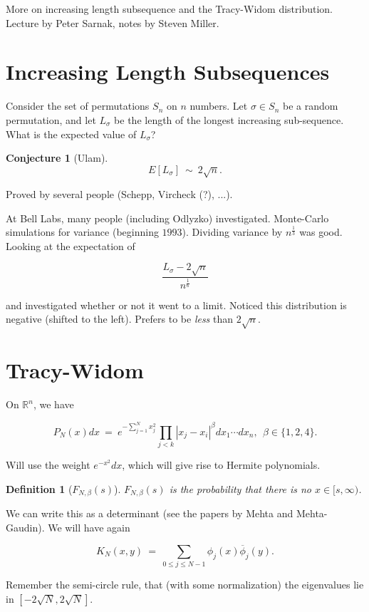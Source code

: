 \documentclass[12pt,letterpaper]{report}
\newcommand\be{\begin{equation}}
\newcommand\ee{\end{equation}}
\newcommand{\R}{\ensuremath{\mathbb{R}}}
\newtheorem{conj}[thm]{Conjecture}
\newtheorem{defi}[thm]{Definition}
\begin{document}
More on increasing length subsequence and the Tracy-Widom
distribution. Lecture by Peter Sarnak, notes by Steven Miller.


\section{Increasing Length Subsequences}

Consider the set of permutations $S_n$ on $n$ numbers. Let $\sigma
\in S_n$ be a random permutation, and let $L_\sigma$ be the length
of the longest increasing sub-sequence. What is the expected value
of $L_\sigma$?

\begin{conj}[Ulam]
\be E[L_\sigma] \ \sim \ 2 \sqrt{n}. \ee
\end{conj}

Proved by several people (Schepp, Vircheck (?), ...).

At Bell Labs, many people (including Odlyzko) investigated.
Monte-Carlo simulations for variance (beginning $1993$). Dividing
variance by $n^{\frac{1}{3}}$ was good. Looking at the expectation
of

\be \frac{L_\sigma - 2 \sqrt{n}}{n^{\frac{1}{6}}} \ee

and investigated whether or not it went to a limit. Noticed this
distribution is negative (shifted to the left). Prefers to be
\emph{less} than $2\sqrt{n}$.

\section{Tracy-Widom}

On $\R^n$, we have

\be P_N(x) dx \ = \ e^{-\sum_{j=1}^N x_j^2} \prod_{j<k} \left| x_j
- x_i \right|^\beta dx_1 \cdots dx_n, \ \ \beta \in \{1,2,4\}. \ee


Will use the weight $e^{-x^2} dx$, which will give rise to Hermite
polynomials.

\begin{defi}[$F_{N,\beta}(s)$] $F_{N,\beta}(s)$ is the probability that there is
no $x \in [s,\infty)$.
\end{defi}

We can write this as a determinant (see the papers by Mehta and
Mehta-Gaudin). We will have again

\be K_N(x,y) \ = \ \sum_{0 \le j \le N-1} \phi_j(x)
\overline{\phi}_j(y). \ee

Remember the semi-circle rule, that (with some normalization) the
eigenvalues lie in $[-2\sqrt{N},2\sqrt{N}]$.
\end{document}
